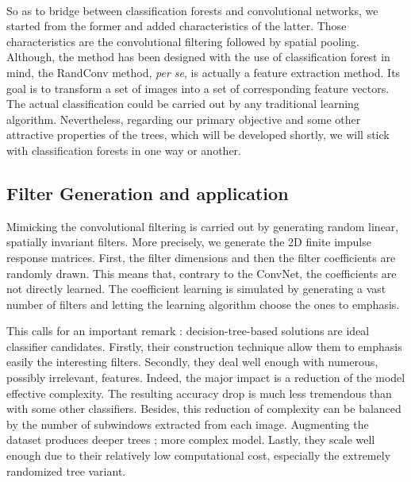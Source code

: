 \documentclass[a4paper]{report}
\begin{document}
	\paragraph{}
	So as to bridge between classification forests and convolutional networks, we started from the former and added characteristics of the latter. Those characteristics are the convolutional filtering followed by spatial pooling.
	Although, the method has been designed with the use of classification forest in mind, the RandConv method, \textit{per se}, is actually a feature extraction method. Its goal is to transform a set of images into a set of corresponding feature vectors. The actual classification could be carried out by any traditional learning algorithm. Nevertheless, regarding our primary objective and some other attractive properties of the trees, which will be developed shortly, we will stick with classification forests in one way or another.

	
		\subsection{Filter Generation and application}\label{subsec:methodo-filtergen}
		Mimicking the convolutional filtering is carried out by generating random linear, spatially invariant filters. More precisely, we generate the 2D finite impulse response matrices. First, the filter dimensions and then the filter coefficients are randomly drawn. This means that, contrary to the ConvNet, the coefficients are not directly learned. The coefficient learning is simulated by generating a vast number of filters and letting the learning algorithm choose the ones to emphasis. 
		\par
		This calls for an important remark : decision-tree-based solutions are ideal classifier candidates. Firstly, their construction technique allow them to emphasis easily the interesting filters. Secondly, they deal well enough with numerous, possibly irrelevant, features. Indeed, the major impact is a reduction of the model effective complexity. The resulting accuracy drop is much less tremendous than with some other classifiers. Besides, this reduction of complexity can be balanced by the number of subwindows extracted from each image. Augmenting the dataset produces deeper trees ; more complex model. Lastly, they scale well enough due to their relatively low computational cost, especially the extremely randomized tree variant.
		
\end{document}
